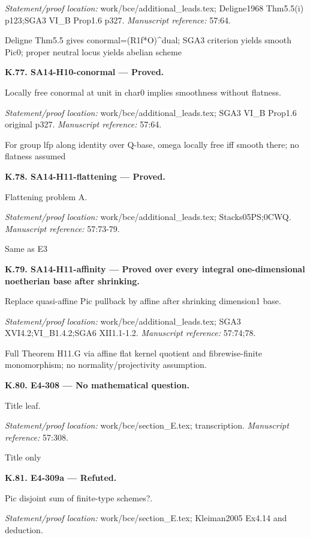 \par\emph{Statement/proof location:} work/bce/additional\_leads.tex; Deligne1968 Thm5.5(i) p123;SGA3 VI\_B Prop1.6 p327.
\emph{Manuscript reference:} 57:64.
\par Deligne Thm5.5 gives conormal=(R1f*O)\textasciicircum{}dual; SGA3 criterion yields smooth Pic0; proper neutral locus yields abelian scheme
\par\medskip\noindent\textbf{K.77. SA14-H10-conormal --- Proved.}\par
Locally free conormal at unit in char0 implies smoothness without flatness.
\par\emph{Statement/proof location:} work/bce/additional\_leads.tex; SGA3 VI\_B Prop1.6 original p327.
\emph{Manuscript reference:} 57:64.
\par For group lfp along identity over Q-base, omega locally free iff smooth there; no flatness assumed
\par\medskip\noindent\textbf{K.78. SA14-H11-flattening --- Proved.}\par
Flattening problem A.
\par\emph{Statement/proof location:} work/bce/additional\_leads.tex; Stacks05PS;0CWQ.
\emph{Manuscript reference:} 57:73-79.
\par Same as E3
\par\medskip\noindent\textbf{K.79. SA14-H11-affinity --- Proved over every integral one-dimensional noetherian base after shrinking.}\par
Replace quasi-affine Pic pullback by affine after shrinking dimension1 base.
\par\emph{Statement/proof location:} work/bce/additional\_leads.tex; SGA3 XVI4.2;VI\_B1.4.2;SGA6 XII1.1-1.2.
\emph{Manuscript reference:} 57:74;78.
\par Full Theorem H11.G via affine flat kernel quotient and fibrewise-finite monomorphism; no normality/projectivity assumption.
\par\medskip\noindent\textbf{K.80. E4-308 --- No mathematical question.}\par
Title leaf.
\par\emph{Statement/proof location:} work/bce/section\_E.tex; transcription.
\emph{Manuscript reference:} 57:308.
\par Title only
\par\medskip\noindent\textbf{K.81. E4-309a --- Refuted.}\par
Pic disjoint sum of finite-type schemes?.
\par\emph{Statement/proof location:} work/bce/section\_E.tex; Kleiman2005 Ex4.14 and deduction.
